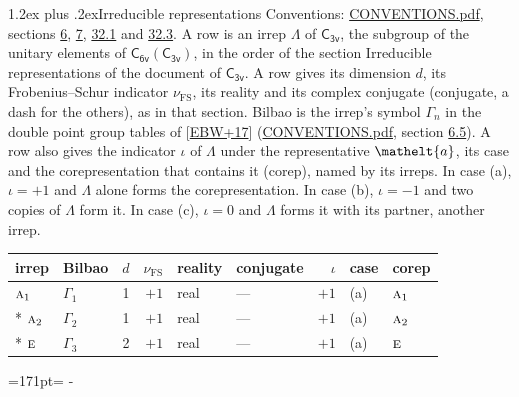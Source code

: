 \documentclass[10pt,a4paper]{article}
\makeatletter
\renewcommand\section{\@startsection{section}{1}{\z@}{-3ex plus -1ex minus -.2ex}%
  {1.2ex plus .2ex}{\normalfont\large\sffamily\bfseries\color{parttitle}}}
\newcommand{\needspace}[1]{\par\penalty-100\begingroup\dimen0=#1\relax\dimen2=\pagegoal
  \advance\dimen2-\pagetotal\ifdim\dimen0>\dimen2\relax\ifdim\dimen2>0pt\vfil\break\fi\fi
  \endgroup}
\numberwithin{equation}{section}
\newcommand{\eltfont}[1]{{\let\sigma\eltsigma\mathelt{#1}}}
\newcommand{\grp}[1]{\mathsf{#1}}
\newcommand{\irr}[1]{\text{\normalfont\scshape #1}}
\newcommand{\elt}[1]{\eltfont{#1}}
\newcommand{\fsind}{\nu_{\mathrm{FS}}}
\makeatother
\begin{document}
\section{Irreducible representations}\label{s:irreps}
Conventions: \href{../../CONVENTIONS.pdf}{CONVENTIONS.pdf}, sections \href{../../../rotation/CONVENTIONS.pdf\#conv.6}{6}, \href{../../../rotation/CONVENTIONS.pdf\#conv.7}{7}, \href{../../CONVENTIONS.pdf\#conv.32.1}{32.1} and \href{../../CONVENTIONS.pdf\#conv.32.3}{32.3}.
\leavevmode\label{n:irrep.Delta}A row is an irrep $\Lambda$ of $\grp{C_{3v}}$, the subgroup of the unitary elements of $\grp{C_{6v}}(\grp{C_{3v}})$, in the order of the section Irreducible representations of the document of \href{../../../rotation/data/pdf/C3v.pdf}{$\grp{C_{3v}}$}. \label{n:index.dimension}\label{n:index.frobenius}\label{n:head.irrep}\label{n:head.reality}\label{n:head.conjugate}A row gives its dimension $d$, its Frobenius--Schur indicator $\fsind$, its reality and its complex conjugate (conjugate, a dash for the others), as in that section. \label{n:head.bilbao}\label{n:irrep.alias.gamma}Bilbao is the irrep's symbol $\Gamma_n$ in the double point group tables of [\href{../../../REFERENCES.pdf\#ref.EBW+17}{EBW+17}] (\href{../../CONVENTIONS.pdf}{CONVENTIONS.pdf}, section \href{../../../rotation/CONVENTIONS.pdf\#conv.6.5}{6.5}). \label{n:head.case.corep}\label{n:head.corep}A row also gives the indicator $\iota$ of $\Lambda$ under the representative $\elt{a}$, its case and the corepresentation that contains it (corep), named by its irreps. In case (a), $\iota = +1$ and $\Lambda$ alone forms the corepresentation. In case (b), $\iota = -1$ and two copies of $\Lambda$ form it. In case (c), $\iota = 0$ and $\Lambda$ forms it with its partner, another irrep.
\setlength{\emergencystretch}{2em}\par\setlength{\emergencystretch}{0pt}
{\small\renewcommand{\arraystretch}{1.25}\setlength{\tabcolsep}{4pt}\begin{longtable}{@{}llrrllrll@{}}\toprule
irrep & Bilbao & $d$ & $\fsind$ & reality & conjugate & $\iota$ & case & corep\\\midrule\endhead
\bottomrule\endfoot\endlastfoot
$\irr{a}_{1}$ & $\Gamma_{1}$ & 1 & $+1$ & real & --- & $+1$ & (a) & $\irr{a}_{1}$\\*
$\irr{a}_{2}$ & $\Gamma_{2}$ & 1 & $+1$ & real & --- & $+1$ & (a) & $\irr{a}_{2}$\\*
$\irr{e}$ & $\Gamma_{3}$ & 2 & $+1$ & real & --- & $+1$ & (a) & $\irr{e}$\\
\bottomrule\end{longtable}}
\needspace{171pt}
\end{document}
